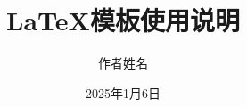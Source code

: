 \documentclass[unicode,master,pdfcover]{scutthesis} %
\begin{document}
	\title{LaTeX模板使用说明}	
	\author{作者姓名}	
	\date{2025年1月6日}
	\maketitle	
	\frontmatter	%
	\tableofcontents	%
	
	\begingroup
		\renewcommand*{\addvspace}[1]{}
		\newcommand{\loflabel}{图} 
		\renewcommand{\numberline}[1]{\loflabel~#1\hspace*{1em}}	
		\listoffigures
		
		\newcommand{\lotlabel}{表}
		\renewcommand{\numberline}[1]{\lotlabel~#1\hspace*{1em}}
		\listoftables
	\endgroup

	
	\mainmatter %
	
    \pagestyle{fancy}	%
	
\end{document}
